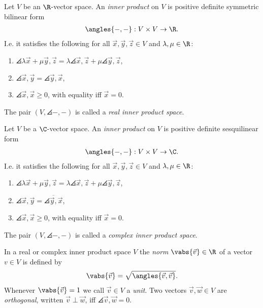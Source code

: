\documentclass{article}
\begin{document}
\begin{definition}
	Let $V$ be an $\R$-vector space. An \emph{inner product} on $V$ is positive definite symmetric bilinear
	form
	\begin{align*}
		\angles{-,-}:V\times V\to\R.
	\end{align*}
	I.e. it satisfies the following for all $\vec x,\vec y,\vec z\in V$ and $\lambda,\mu\in\R$:
	\begin{enumerate}
		\item $\angles{\lambda\vec x+\mu\vec y,\vec z}=\lambda\angles{\vec x,\vec z}+\mu\angles{\vec y,\vec z}$,
		\item $\angles{\vec x,\vec y}=\angles{\vec y,\vec x}$,
		\item $\angles{\vec x,\vec x}\geq 0$, with equality iff $\vec x =0$.
	\end{enumerate}
	The pair $(V,\angles{-,-})$ is called a \emph{real inner product space}.
\end{definition}

\begin{definition}
	Let $V$ be a $\C$-vector space. An \emph{inner product} on $V$ is positive definite sesquilinear
	form
	\begin{align*}
		\angles{-,-}:V\times V\to\C.
	\end{align*}
	I.e. it satisfies the following for all $\vec x,\vec y,\vec z\in V$ and $\lambda,\mu\in\R$:
	\begin{enumerate}
		\item $\angles{\lambda\vec x+\mu\vec y,\vec z}=\lambda\angles{\vec x,\vec z}+\mu\angles{\vec y,\vec z}$,
		\item $\angles{\vec x,\vec y}=\overline{\angles{\vec y,\vec x}}$,
		\item $\angles{\vec x,\vec x}\geq 0$, with equality iff $\vec x =0$.
	\end{enumerate}
	The pair $(V,\angles{-,-})$ is called a \emph{complex inner product space}.
\end{definition}

\begin{definition}
	In a real or complex inner product space $V$ the \emph{norm} $\vabs{\vec v}\in\R$ of a vector $v\in V$
	is defined by
	\begin{align*}
		\vabs{\vec v}=\sqrt{\angles{\vec v, \vec v}}.
	\end{align*}
	Whenever $\vabs{\vec v}=1$ we call $\vec v\in V$ a \emph{unit}. Two vectors $\vec v,\vec w\in V$
	are \emph{orthogonal}, written $\vec v\perp \vec w$, iff $\angles{\vec v,\vec w}=0$.
\end{definition}
\end{document}
